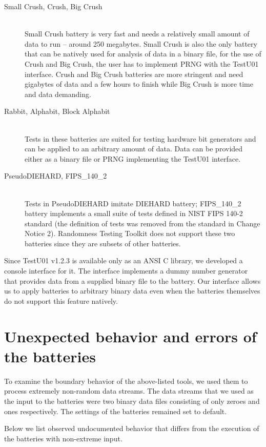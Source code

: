 \documentclass[
	digital,    %
	oneside,
	color,
	11pt,
	nocover,
	notable,
	nolof,
	nolot,
]{fithesis3}
\theoremstyle{definition}
\theoremstyle{remark}
\begin{document}
\begin{description}
\item[Small Crush, Crush, Big Crush] \hfill \\
Small Crush battery is very fast and needs a relatively small amount of data to run -- around 250 megabytes. Small Crush is also the only battery that can be natively used for analysis of data in a binary file, for the use of Crush and Big Crush, the user has to implement PRNG with the TestU01 interface. Crush and Big Crush batteries are more stringent and need gigabytes of data and a few hours to finish while Big Crush is more time and data demanding.
\item[Rabbit, Alphabit, Block Alphabit] \hfill \\
Tests in these batteries are suited for testing hardware bit generators and can be applied to an arbitrary amount of data. Data can be provided either as a binary file or PRNG implementing the TestU01 interface.
\item[PseudoDIEHARD, FIPS\_140\_2] \hfill \\
Tests in PseudoDIEHARD imitate DIEHARD battery; FIPS\_140\_2 battery implements a small suite of tests defined in NIST FIPS 140-2 standard \cite{nist-fips-140-2} (the definition of tests was removed from the standard in Change Notice 2). Randomness Testing Toolkit does not support these two batteries since they are subsets of other batteries.
\end{description}

Since TestU01 v1.2.3 is available only as an ANSI C library, we developed a console interface for it. The interface implements a dummy number generator that provides data from a supplied binary file to the battery. Our interface allows us to apply batteries to arbitrary binary data even when the batteries themselves do not support this feature natively.

\section{Unexpected behavior and errors of the batteries}
To examine the boundary behavior of the above-listed tools, we used them to process extremely non-random data streams. The data streams that we used as the input to the batteries were two binary data files consisting of only zeroes and ones respectively. The settings of the batteries remained set to default. 

Below we list observed undocumented behavior that differs from the execution of the batteries with non-extreme input.
\end{document}

